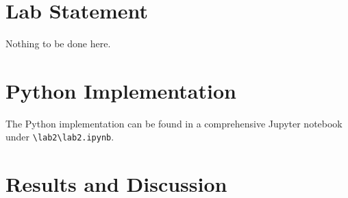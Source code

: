 \section{Lab Statement}

Nothing to be done here.


\section{Python Implementation}

The Python implementation can be found in a comprehensive Jupyter notebook under \verb|\lab2\lab2.ipynb|.


\section{Results and Discussion}

